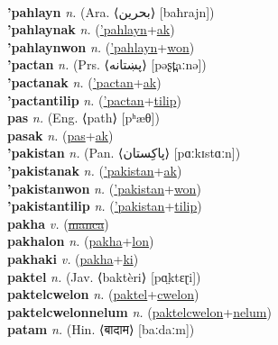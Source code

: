  \label{'pahi} \\
\textbf{'pahlayn} \textit{n.} (Ara. ⟨بحرين‎⟩ [baħrajn])
 \label{'pahlayn} \\
\textbf{'pahlaynak} \textit{n.} (\hyperref['pahlayn]{'pahlayn}+\hyperref[ak]{ak})
 \label{'pahlaynak} \\
\textbf{'pahlaynwon} \textit{n.} (\hyperref['pahlayn]{'pahlayn}+\hyperref[won]{won})
 \label{'pahlaynwon} \\
\textbf{'pactan} \textit{n.} (Prs. ⟨پښتانه‎‎⟩ [pəʂt̪aːnə])
 \label{'pactan} \\
\textbf{'pactanak} \textit{n.} (\hyperref['pactan]{'pactan}+\hyperref[ak]{ak})
 \label{'pactanak} \\
\textbf{'pactantilip} \textit{n.} (\hyperref['pactan]{'pactan}+\hyperref[tilip]{tilip})
 \label{'pactantilip} \\
\textbf{pas} \textit{n.} (Eng. ⟨path⟩ [pʰæθ])
 \label{pas} \\
\textbf{pasak} \textit{n.} (\hyperref[pas]{pas}+\hyperref[ak]{ak})
 \label{pasak} \\
\textbf{'pakistan} \textit{n.} (Pan. ⟨پاکِستان‎⟩ [pɑːkɪstɑːn])
 \label{'pakistan} \\
\textbf{'pakistanak} \textit{n.} (\hyperref['pakistan]{'pakistan}+\hyperref[ak]{ak})
 \label{'pakistanak} \\
\textbf{'pakistanwon} \textit{n.} (\hyperref['pakistan]{'pakistan}+\hyperref[won]{won})
 \label{'pakistanwon} \\
\textbf{'pakistantilip} \textit{n.} (\hyperref['pakistan]{'pakistan}+\hyperref[tilip]{tilip})
 \label{'pakistantilip} \\
\textbf{pakha} \textit{v.} (\hyperref[manca]{\sout{manca}})
 \label{pakha} \\
\textbf{pakhalon} \textit{n.} (\hyperref[pakha]{pakha}+\hyperref[lon]{lon})
 \label{pakhalon} \\
\textbf{pakhaki} \textit{v.} (\hyperref[pakha]{pakha}+\hyperref[ki]{ki})
 \label{pakhaki} \\
\textbf{paktel} \textit{n.} (Jav. ⟨baktèri⟩ [pɑ̤ktɛɽi])
 \label{paktel} \\
\textbf{paktelcwelon} \textit{n.} (\hyperref[paktel]{paktel}+\hyperref[cwelon]{cwelon})
 \label{paktelcwelon} \\
\textbf{paktelcwelonnelum} \textit{n.} (\hyperref[paktelcwelon]{paktelcwelon}+\hyperref[nelum]{nelum})
 \label{paktelcwelonnelum} \\
\textbf{patam} \textit{n.} (Hin. ⟨बादाम⟩ [baːdaːm])
 \label{patam} \\
